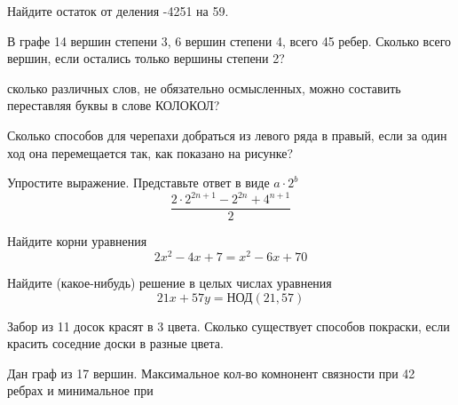 \documentclass[12pt]{article}
\begin{document}
\begin{enumerate}
\item Найдите остаток от деления -4251 на 59.
\item В графе 14 вершин степени 3, 6 вершин степени 4, всего 45 ребер. Сколько всего вершин, если
остались только вершины степени 2?
\item сколько различных слов, не обязательно осмысленных, можно составить переставляя буквы в слове
КОЛОКОЛ?

\begin{minipage}{0.5\textwidth}
\item Сколько способов для черепахи добраться из левого ряда в правый, если за один ход она
перемещается так, как показано на рисунке?
\item Упростите выражение. Представьте ответ в виде $a \cdot 2^{b}$
\[ \frac{2 \cdot 2^{2n + 1} - 2^{2n} + 4^{n + 1}}{2}\]
\item Найдите корни уравнения
\[ 2x^2 - 4x + 7 = x^2 - 6x + 70\]
\end{minipage}
\begin{minipage}{0.4\textwidth}
\end{minipage}
\item Найдите (какое-нибудь) решение в целых числах уравнения
\[ 21x + 57y = \text{НОД}(21, 57)\]
\item Забор из 11 досок красят в 3 цвета. Сколько существует способов покраски, если красить
соседние доски в разные цвета.
\item Дан граф из 17 вершин. Максимальное кол-во комнонент связности при 42 ребрах и минимальное при

\end{enumerate}
\end{document}
